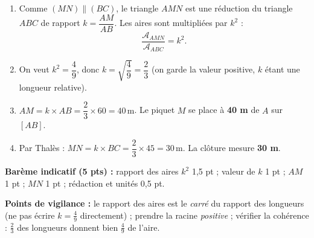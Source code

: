 \documentclass[11pt]{article}
\begin{document}
\begin{corrige}
\begin{enumerate}
    \item Comme $(MN) \parallel (BC)$, le triangle $AMN$ est une réduction du triangle $ABC$ de rapport $k = \dfrac{AM}{AB}$. Les aires sont multipliées par $k^2$ :
    \[ \dfrac{\mathcal{A}_{AMN}}{\mathcal{A}_{ABC}} = k^2. \]
    \item On veut $k^2 = \dfrac{4}{9}$, donc $k = \sqrt{\dfrac{4}{9}} = \dfrac{2}{3}$ (on garde la valeur positive, $k$ étant une longueur relative).
    \item $AM = k \times AB = \dfrac{2}{3} \times 60 = 40\,\text{m}$. Le piquet $M$ se place à \textbf{40 m} de $A$ sur $[AB]$.
    \item Par Thalès : $MN = k \times BC = \dfrac{2}{3} \times 45 = 30\,\text{m}$. La clôture mesure \textbf{30 m}.
\end{enumerate}
\textbf{Barème indicatif (5 pts) :} rapport des aires $k^2$ 1,5 pt ; valeur de $k$ 1 pt ; $AM$ 1 pt ; $MN$ 1 pt ; rédaction et unités 0,5 pt.

\textbf{Points de vigilance :} le rapport des aires est le \emph{carré} du rapport des longueurs (ne pas écrire $k = \frac{4}{9}$ directement) ; prendre la racine \emph{positive} ; vérifier la cohérence : $\frac{2}{3}$ des longueurs donnent bien $\frac{4}{9}$ de l'aire.
\end{corrige}
\end{document}
